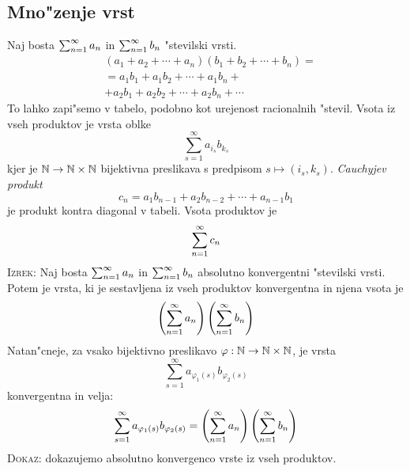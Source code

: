 \subsection{Mno"zenje vrst}
Naj bosta $\sum_{n = 1}^{\infty}a_n$ in $\sum_{n = 1}^{\infty} b_n$ "stevilski vrsti.
\begin{align*}
&(a_1 + a_2 + \cdots + a_n)(b_1 + b_2 + \cdots + b_n) = \\
&= a_1 b_1 + a_1 b_2 + \cdots + a_1 b_n + \\
&+ a_2 b_1 + a_2 b_2 + \cdots + a_2 b_n + \cdots
\end{align*}
To lahko zapi"semo v tabelo, podobno kot urejenost racionalnih "stevil. Vsota iz vseh produktov je vrsta oblke
\begin{equation*}
\sum_{s=1}^{\infty} a_{i_s} b_{k_s}
\end{equation*}
kjer je $\mathbb{N} \to \mathbb{N} \times \mathbb{N}$ bijektivna preslikava s predpisom $s \mapsto (i_s, k_s)$. \emph{Cauchyjev produkt}
\begin{equation*}
c_n = a_1b_{n-1} + a_2 b_{n-2} + \cdots + a_{n-1} b_1
\end{equation*}
je produkt kontra diagonal v tabeli. Vsota produktov je
\begin{equation*}
\sum_{n = 1}^{\infty}c_n
\end{equation*}
\textsc{Izrek:} Naj bosta $\sum_{n = 1}^{\infty}a_n$ in $\sum_{n = 1}^{\infty}b_n$ absolutno konvergentni "stevilski vrsti. Potem je vrsta, ki je sestavljena iz vseh produktov konvergentna in njena vsota je
\begin{equation*}
\left(\sum_{n = 1}^{\infty}a_n\right)\left(\sum_{n = 1}^{\infty}b_n\right)
\end{equation*}
Natan"cneje, za vsako bijektivno preslikavo $\varphi: \mathbb{N}\to \mathbb{N} \times \mathbb{N}$, je vrsta
\begin{equation*}
\sum_{s=1}^{\infty}a_{\varphi_1(s)} b_{\varphi_2(s)}
\end{equation*}
konvergentna in velja:
\begin{equation*}
\sum_{s=1}^{\infty}a_{\varphi_1(s)} b_{\varphi_2(s)} = \left(\sum_{n = 1}^{\infty}a_n\right)\left(\sum_{n = 1}^{\infty}b_n\right)
\end{equation*}
\textsc{Dokaz:} dokazujemo absolutno konvergenco vrste iz vseh produktov. 

